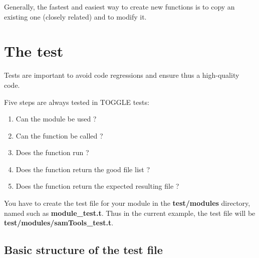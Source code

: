 \documentclass[a4paper,10pt]{report}
\begin{document}
Generally, the fastest and easiest way to create new functions is to copy an existing one (closely related) and to modify it.

\newpage

\section{The test}

Tests are important to avoid code regressions and ensure thus a high-quality code.

Five steps are always tested in TOGGLE tests:

\begin{enumerate}
 \item Can the module be used ?
 \item Can the function be called ?
 \item Does the function run ?
 \item Does the function return the good file list ?
 \item Does the function return the expected resulting file ?
\end{enumerate}

You have to create the test file for your module in the \textbf{test/modules} directory, named such as \textbf{module\_test.t}. Thus in the current example, the test file will be \textbf{test/modules/samTools\_test.t}.

\subsection{Basic structure of the test file}
\end{document}
